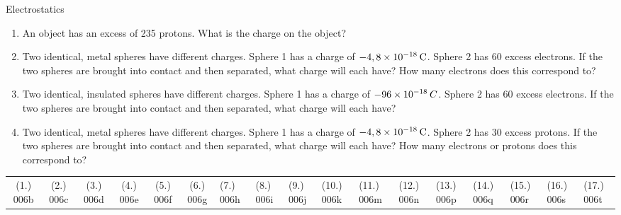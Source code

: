 \begin{eocexercises}{Electrostatics}
\begin{enumerate}[noitemsep, label=\textbf{\arabic*}. ]
            \item An object has an excess of 235 protons. What is the charge on the object?\newline
            \item Two identical, metal spheres have different charges. Sphere 1 has a charge of 
$-4,8\ensuremath{\times}{10}^{-18}\phantom{\rule{2pt}{0ex}}\text{C}$. Sphere 2 has 60 excess electrons. If the two spheres are brought into contact and then separated, what charge will each have? How many electrons does this correspond to?\newline
            \item Two identical, insulated spheres have different charges. Sphere 1 has a charge of 
$-96\ensuremath{\times}{10}^{-18}\phantom{\rule{2pt}{0ex}}C$. Sphere 2 has 60 excess electrons. If the two spheres are brought into contact and then separated, what charge will each have? \newline
            \item Two identical, metal spheres have different charges. Sphere 1 has a charge of 
$-4,8\ensuremath{\times}{10}^{-18}\phantom{\rule{2pt}{0ex}}\text{C}$. Sphere 2 has 30 excess protons. If the two spheres are brought into contact and then separated, what charge will each have? How many electrons or protons does this correspond to?\newline
            \end{enumerate}
  \label{m38781**end}
  \label{464e844ca5615087ea89d9d95dd9a43a**end}
\par \practiceinfo
 \par \begin{tabular}[h]{cccccc}
 (1.) 006b  &  (2.) 006c  &  (3.) 006d  &  (4.) 006e  &  (5.) 006f  &  (6.) 006g  &  (7.) 006h  &  (8.) 006i  &  (9.) 006j  &  (10.) 006k  &  (11.) 006m  &  (12.) 006n  &  (13.) 006p  &  (14.) 006q  &  (15.) 006r  &  (16.) 006s  &  (17.) 006t  & \end{tabular}
\end{eocexercises}
